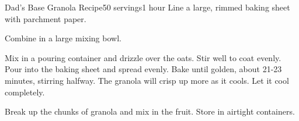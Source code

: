 \documentclass[../Cookbook.tex]{subfiles}
\begin{document}
\begin{recipe}[DadsGranola]{Dad's Base Granola Recipe}{50 servings}{1 hour}
Line a large, rimmed baking sheet with parchment paper.

Combine in a large mixing bowl.

Mix in a pouring container and drizzle over the oats.
Stir well to coat evenly.
Pour into the baking sheet and spread evenly.
Bake until golden, about 21-23 minutes, stirring halfway.
The granola will crisp up more as it cools.
Let it cool completely.

Break up the chunks of granola and mix in the fruit.
Store in airtight containers.
\end{recipe}
\end{document}
